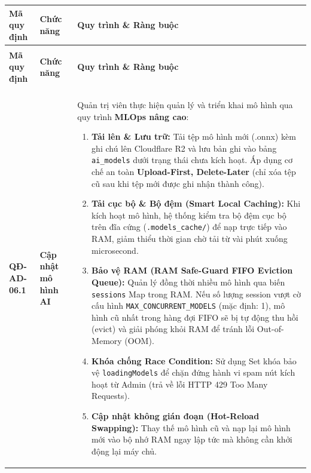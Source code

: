 \documentclass[12pt,a4paper]{article}
\begin{document}
\begin{longtable}{|
        >{\raggedright\arraybackslash}p{2.2cm}|
        >{\raggedright\arraybackslash}p{2.8cm}|
        >{\raggedright\arraybackslash}p{9.8cm}|}
    \hline
    \rowcolor{headerblue}
    \textbf{Mã quy định} & \textbf{Chức năng} & \textbf{Quy trình \& Ràng buộc} \\
    \hline
    \endfirsthead
    \multicolumn{3}{c}{{\tablename\ -- Tiếp theo trang trước}} \\
    \hline
    \rowcolor{headerblue}
    \textbf{Mã quy định} & \textbf{Chức năng} & \textbf{Quy trình \& Ràng buộc} \\
    \hline
    \endhead
    \hline \multicolumn{3}{|r|}{{Tiếp tục ở trang sau...}} \\ \hline
    \endfoot
    \hline
    \endlastfoot
    \textbf{QĐ-AD-06.1} & \textbf{Cập nhật mô hình AI} &
    Quản trị viên thực hiện quản lý và triển khai mô hình qua quy trình \textbf{MLOps nâng cao}:
    \begin{enumerate}[leftmargin=*,topsep=2pt,itemsep=1pt]
        \item \textbf{Tải lên \& Lưu trữ:} Tải tệp mô hình mới (.onnx) kèm ghi chú lên Cloudflare R2 và lưu bản ghi vào bảng \texttt{ai\_models} dưới trạng thái chưa kích hoạt. Áp dụng cơ chế an toàn \textbf{Upload-First, Delete-Later} (chỉ xóa tệp cũ sau khi tệp mới được ghi nhận thành công).
        \item \textbf{Tải cục bộ \& Bộ đệm (Smart Local Caching):} Khi kích hoạt mô hình, hệ thống kiểm tra bộ đệm cục bộ trên đĩa cứng (\texttt{.models\_cache/}) để nạp trực tiếp vào RAM, giảm thiểu thời gian chờ tải từ vài phút xuống microsecond.
        \item \textbf{Bảo vệ RAM (RAM Safe-Guard FIFO Eviction Queue):} Quản lý đồng thời nhiều mô hình qua biến \texttt{sessions} Map trong RAM. Nếu số lượng session vượt cờ cấu hình \texttt{MAX\_CONCURRENT\_MODELS} (mặc định: 1), mô hình cũ nhất trong hàng đợi FIFO sẽ bị tự động thu hồi (evict) và giải phóng khỏi RAM để tránh lỗi Out-of-Memory (OOM).
        \item \textbf{Khóa chống Race Condition:} Sử dụng Set khóa bảo vệ \texttt{loadingModels} để chặn đứng hành vi spam nút kích hoạt từ Admin (trả về lỗi HTTP 429 Too Many Requests).
        \item \textbf{Cập nhật không gián đoạn (Hot-Reload Swapping):} Thay thế mô hình cũ và nạp lại mô hình mới vào bộ nhớ RAM ngay lập tức mà không cần khởi động lại máy chủ.
    \end{enumerate} \\

\end{longtable}
\end{document}
